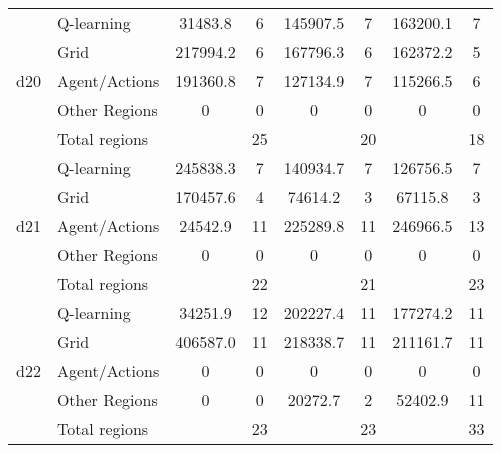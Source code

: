 \begin{tabular}{ c l | cc | cc | cc }
\midrule
%
%
\multirow{5}{*}{d20} & Q-learning 	& 31483.8&6 	&145907.5&7 	&163200.1&7\\
& Grid 					& 217994.2&6 	&167796.3&6 	&162372.2&5 \\
& Agent/Actions 				& 191360.8&7 	&127134.9&7 	&115266.5&6\\
& Other Regions	 			& 0&0 		&0&0 			&0&0\\
& Total regions 				& &25 		&&20 			&&18\\

\midrule
\multirow{5}{*}{d21} & Q-learning 	& 245838.3&7 	&140934.7&7 	&126756.5&7\\
& Grid 					& 170457.6&4 	&74614.2&3 		&67115.8&3 \\
& Agent/Actions 				& 24542.9&11 	&225289.8&11 	&246966.5&13\\
& Other Regions	 			& 0&0 		&0&0 			&0&0\\
& Total regions 				& &22 		&&21 			&&23\\

\midrule 
\multirow{5}{*}{d22} & Q-learning 	& 34251.9&12 	&202227.4&11 	&177274.2&11\\
& Grid 					& 406587.0&11 	&218338.7&11 	&211161.7&11 \\
& Agent/Actions 				& 0&0 		&0&0 			&0&0\\
& Other Regions	 			& 0&0 		&20272.7&2 		&52402.9&11\\
& Total regions 				& &23 		&&23 			&&33\\


\bottomrule
\end{tabular}

